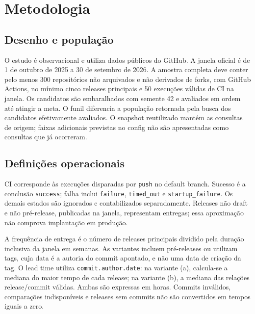 \section{Metodologia}
\label{sec:metodologia}

\subsection{Desenho e população}

O estudo é observacional e utiliza dados públicos do GitHub. A janela oficial é
de 1 de outubro de 2025 a 30 de setembro de 2026. A amostra completa deve conter
pelo menos 300 repositórios não arquivados e não derivados de forks, com GitHub
Actions, no mínimo cinco releases principais e 50 execuções válidas de CI na janela.
Os candidatos são embaralhados com semente 42 e avaliados em ordem até atingir a
meta. O funil diferencia a população retornada pela busca dos candidatos efetivamente
avaliados. O snapshot reutilizado mantém as consultas de origem; faixas adicionais
previstas no config não são apresentadas como consultas que já ocorreram.


\subsection{Definições operacionais}

CI corresponde às execuções disparadas por \texttt{push} no default branch.
Sucesso é a conclusão \texttt{success}; falha inclui \texttt{failure},
\texttt{timed\_out} e \texttt{startup\_failure}. Os demais estados são ignorados
e contabilizados separadamente. Releases não draft e não pré-release, publicadas
na janela, representam entregas; essa aproximação não comprova implantação em produção.

A frequência de entrega é o número de releases principais dividido pela duração
inclusiva da janela em semanas. As variantes incluem pré-releases ou utilizam
tags, cuja data é a autoria do commit apontado, e não uma data de criação da tag.
O lead time utiliza \texttt{commit.author.date}: na variante (a), calcula-se a
mediana do maior tempo de cada release; na variante (b), a mediana das relações
release/commit válidas. Ambas são expressas em horas. Commits inválidos, comparações
indisponíveis e releases sem commits não são convertidos em tempos iguais a zero.

